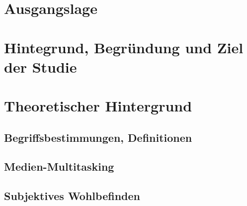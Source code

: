 %
%
\glsresetall
\let\raggedsection\centering 
{}\label{chap.einleitung}
\let\raggedsection\raggedright 

\section{Ausgangslage}\label{section.ausgangslage}

\section{Hintegrund, Begründung und Ziel der Studie}\label{section.hintergrund}

\section{Theoretischer Hintergrund}\label{section.theoHintegrund}
\subsection{Begriffsbestimmungen, Definitionen}\label{subsection.begriffsbestimmung}
\subsection{Medien-Multitasking}\label{subsection.medienMultitasking}
\subsection{Subjektives Wohlbefinden}\label{subsection.subjektivesWohlbefinden}

